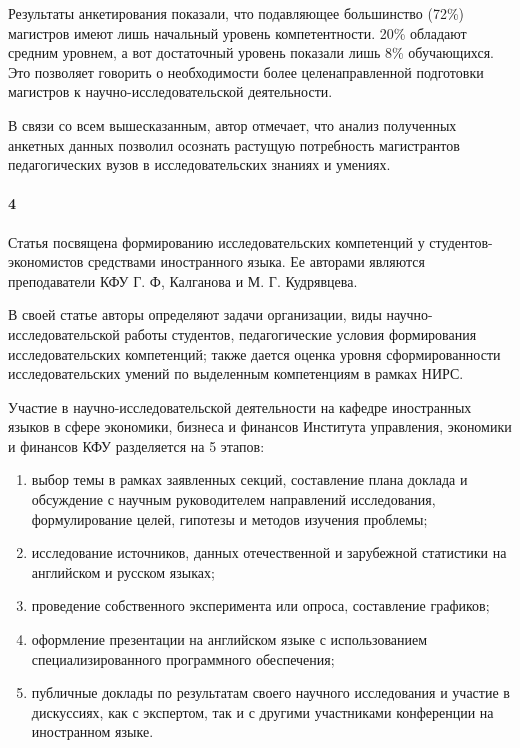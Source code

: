 \documentclass[oneside]{scrartcl}
\begin{document}
Результаты анкетирования показали, что подавляющее большинство (72\%) магистров имеют лишь начальный уровень компетентности.
20\% обладают средним уровнем, а вот достаточный уровень показали лишь 8\% обучающихся. Это позволяет говорить о
необходимости более целенаправленной подготовки магистров к научно-исследовательской деятельности.

В связи со всем вышесказанным, автор отмечает, что анализ полученных анкетных данных позволил осознать растущую потребность
магистрантов педагогических вузов в исследовательских знаниях и умениях.

\paragraph{4}
Статья \cite{kalganova} посвящена формированию исследовательских компетенций у студентов-экономистов средствами
иностранного языка. Ее авторами являются преподаватели КФУ Г. Ф, Калганова и М. Г. Кудрявцева.

В своей статье авторы определяют задачи организации, виды научно-исследовательской работы студентов, педагогические условия
формирования исследовательских компетенций; также дается оценка уровня сформированности исследовательских умений по выделенным
компетенциям в рамках НИРС.

Участие в научно-исследовательской деятельности на кафедре иностранных языков в сфере экономики, бизнеса
и финансов Института управления, экономики и финансов КФУ разделяется на 5 этапов:
\begin{enumerate}[1)]
\item выбор темы в рамках заявленных секций, составление плана доклада и обсуждение с научным руководителем направлений
исследования, формулирование целей, гипотезы и методов изучения проблемы;
\item исследование источников, данных отечественной и зарубежной статистики на английском и русском языках;
\item проведение собственного эксперимента или опроса, составление графиков;
\item оформление презентации на английском языке с использованием специализированного программного обеспечения;
\item публичные доклады по результатам своего научного исследования и участие в дискуссиях, как с экспертом, так и
с другими участниками конференции на иностранном языке.
\end{enumerate}
\end{document}
